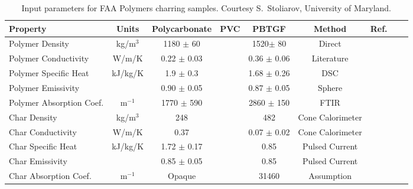 \begin{table}[h!]
\caption[FAA charring polymer properties.]{Input parameters for FAA Polymers charring samples. Courtesy S.~Stoliarov, University of Maryland.}
\begin{tabular}{|l|c|c|c|c|c|c|l|l|}
\hline
Property                    & Units         & Polycarbonate                     & PVC                 &PBTGF  & Method                &  Ref.                    \\ \hline \hline
Polymer Density             & kg/m$^3$      & 1180 $\pm$ 60                     &             &1520$\pm$ 80          & Direct                &  \cite{Stoliarov:CF2010}  \\ \hline
Polymer Conductivity        & W/m/K         & 0.22 $\pm$ 0.03                   &          &0.36 $\pm$ 0.06             & Literature            &  \cite{Stoliarov:CF2010}  \\ \hline
Polymer Specific Heat       & kJ/kg/K       & 1.9 $\pm$ 0.3                     &           &1.68 $\pm$  0.26          & DSC                   &  \cite{Stoliarov:PDS2008}  \\ \hline
Polymer Emissivity          &               & 0.90 $\pm$ 0.05                   &                     &0.87 $\pm$ 0.05  & Sphere                &  \cite{Hallman:PES1974}  \\ \hline
Polymer Absorption Coef.    & m$^{-1}$      & 1770 $\pm$ 590                    &       &2860 $\pm$ 150                & FTIR                  &  \cite{Tsilingiris:ECM2003}  \\ \hline
Char Density                & kg/m$^3$      & 248                               &        &482               & Cone Calorimeter      &  \cite{Stoliarov:CF2010}  \\ \hline
Char Conductivity           & W/m/K         & 0.37                              &        &0.07 $\pm$ 0.02               & Cone Calorimeter      &  \cite{Stoliarov:CF2010}  \\ \hline
Char Specific Heat          & kJ/kg/K       & 1.72 $\pm$ 0.17                   &          &0.85             & Pulsed Current        &  \cite{Stoliarov:CF2010,Matsumoto:1996}  \\ \hline
Char Emissivity             &               & 0.85 $\pm$ 0.05                   &                 &0.85      & Pulsed Current        &  \cite{Stoliarov:CF2010,Matsumoto:1996}  \\ \hline
Char Absorption Coef.       & m$^{-1}$      & Opaque                            &           & 31460           & Assumption            &  \cite{Stoliarov:CF2010}  \\ \hline

\end{tabular}
\end{table}
